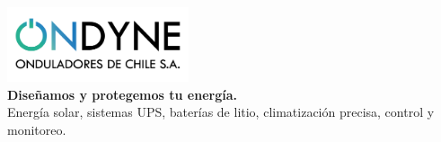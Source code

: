 \documentclass[aspectratio=169,xcolor=dvipsnames]{beamer}
\begin{document}
\begin{frame}{}
\begin{center}
    \includegraphics[width=0.4\textwidth]{background/ondyne_logo.png}\\
    \Large{\textbf{Diseñamos y protegemos tu energía.}}\\
    \small{Energía solar, sistemas UPS, baterías de litio, climatización precisa, control y monitoreo.}\\
\end{center}
\end{frame}
\end{document}
